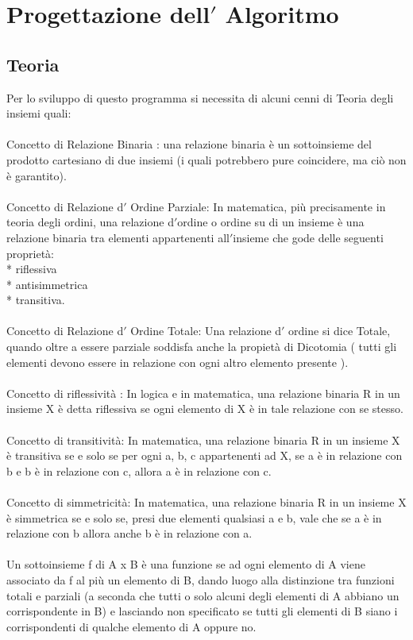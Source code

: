 \documentclass[11pt, a4paper, titlepage, block]{article}
\begin{document}
	
	
	\newpage                        
\section{Progettazione dell$'$ Algoritmo}
\subsection{Teoria}
Per lo sviluppo di questo programma si necessita di alcuni cenni di Teoria degli insiemi quali:\\
\\
Concetto di Relazione Binaria : una relazione binaria \`e un sottoinsieme del prodotto
cartesiano di due insiemi (i quali potrebbero pure coincidere,
ma ci\`o non \`e garantito).\\
\\
Concetto di Relazione d$'$ Ordine Parziale: In matematica, pi\`u precisamente in teoria degli ordini, una relazione d$'$ordine o ordine su di un insieme \`e una relazione binaria tra elementi appartenenti all$'$insieme che gode delle seguenti propriet\`a:\\
* riflessiva\\
* antisimmetrica\\
* transitiva.\\
\\
Concetto di Relazione d$'$ Ordine Totale: Una relazione d$'$ ordine si dice Totale, quando oltre a essere parziale soddisfa anche la propiet\`a di Dicotomia ( tutti gli elementi devono essere in relazione con ogni altro elemento presente ).\\
\\
Concetto di riflessivit\`a : In logica e in matematica, una relazione binaria R in un insieme X \`e detta riflessiva se ogni elemento di X \`e in tale relazione con se stesso. \\
\\
Concetto di transitivit\`a: In matematica, una relazione binaria R in un insieme X \`e transitiva se e solo se per ogni a, b, c appartenenti ad X, se a \`e in relazione con b e b \`e in relazione con c, allora a \`e in relazione con c. \\
\\
Concetto di simmetricit\`a: In matematica, una relazione binaria R in un insieme X \`e simmetrica se e solo se, presi due elementi qualsiasi a e b, vale che se a \`e in relazione con b allora anche b \`e in relazione con a.\\
\\
Un sottoinsieme f di A x B \`e una funzione se ad ogni
elemento di A viene associato da f al pi\`u un elemento di B,
dando luogo alla distinzione tra funzioni totali e parziali
(a seconda che tutti o solo alcuni degli elementi di A
abbiano un corrispondente in B) e lasciando non specificato
se tutti gli elementi di B siano i corrispondenti di
qualche elemento di A oppure no.\\
\newpage
\end{document}
